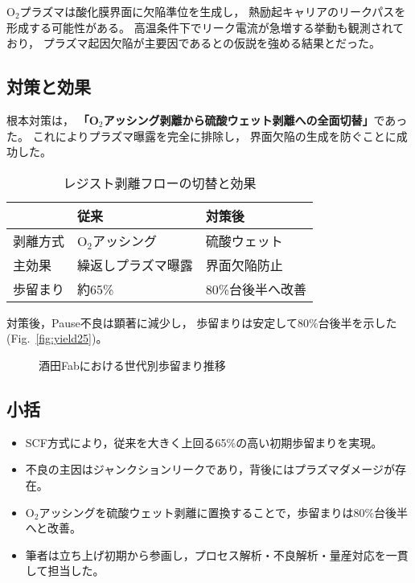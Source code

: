 \documentclass[conference]{IEEEtran}
\begin{document}
O$_2$プラズマは酸化膜界面に欠陥準位を生成し，
熱励起キャリアのリークパスを形成する可能性がある。  
高温条件下でリーク電流が急増する挙動も観測されており，
プラズマ起因欠陥が主要因であるとの仮説を強める結果とだった。

\subsection{対策と効果}
根本対策は，
\textbf{「O$_2$アッシング剥離から硫酸ウェット剥離への全面切替」}であった。  
これによりプラズマ曝露を完全に排除し，
界面欠陥の生成を防ぐことに成功した。  

\begin{table}[h]
  \centering
  \caption{レジスト剥離フローの切替と効果}
  \label{tab:resist}
  \begin{tabular}{lll}
    \toprule
    & 従来 & 対策後 \\
    \midrule
    剥離方式 & O$_2$アッシング & 硫酸ウェット \\
    主効果 & 繰返しプラズマ曝露 & 界面欠陥防止 \\
    歩留まり & 約65\% & 80\%台後半へ改善 \\
    \bottomrule
  \end{tabular}
\end{table}

対策後，Pause不良は顕著に減少し，
歩留まりは安定して80\%台後半を示した
(Fig.~\ref{fig:yield25})。  

\begin{figure}[t]
\centering
{}
\caption{酒田Fabにおける世代別歩留まり推移}
\label{fig:yield_all}
\end{figure}

\subsection{小括}
\begin{itemize}
  \item SCF方式により，従来を大きく上回る65\%の高い初期歩留まりを実現。
  \item 不良の主因はジャンクションリークであり，背後にはプラズマダメージが存在。
  \item O$_2$アッシングを硫酸ウェット剥離に置換することで，歩留まりは80\%台後半へと改善。
  \item 筆者は立ち上げ初期から参画し，プロセス解析・不良解析・量産対応を一貫して担当した。
\end{itemize}
\end{document}

